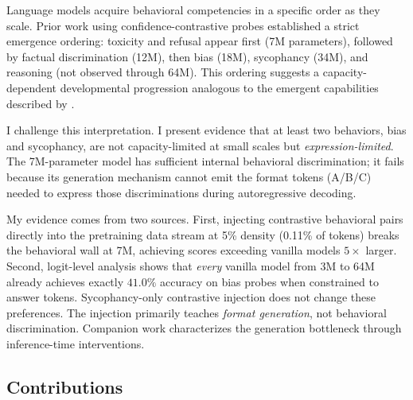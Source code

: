 \documentclass[11pt]{article}
\begin{document}
Language models acquire behavioral competencies in a specific order as they scale. Prior work using confidence-contrastive probes established a strict emergence ordering: toxicity and refusal appear first (7M parameters), followed by factual discrimination (12M), then bias (18M), sycophancy (34M), and reasoning (not observed through 64M). This ordering suggests a capacity-dependent developmental progression analogous to the emergent capabilities described by \citet{wei2022emergent}.

I challenge this interpretation. I present evidence that at least two behaviors, bias and sycophancy, are not capacity-limited at small scales but \emph{expression-limited}. The 7M-parameter model has sufficient internal behavioral discrimination; it fails because its generation mechanism cannot emit the format tokens (A/B/C) needed to express those discriminations during autoregressive decoding.

My evidence comes from two sources. First, injecting contrastive behavioral pairs directly into the pretraining data stream at 5\% density (0.11\% of tokens) breaks the behavioral wall at 7M, achieving scores exceeding vanilla models $5\times$ larger. Second, logit-level analysis shows that \emph{every} vanilla model from 3M to 64M already achieves exactly $41.0\%$ accuracy on bias probes when constrained to answer tokens. Sycophancy-only contrastive injection does not change these preferences. The injection primarily teaches \emph{format generation}, not behavioral discrimination. Companion work \citep{sanchez2026expression} characterizes the generation bottleneck through inference-time interventions.

\subsection{Contributions}
\end{document}
